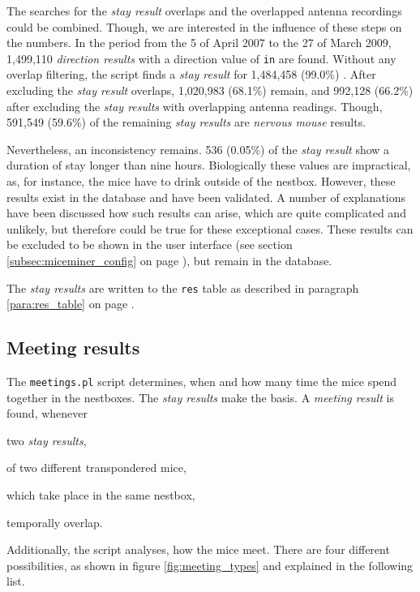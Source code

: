 The searches for the \textit{stay result} overlaps and the overlapped antenna recordings could be combined. Though, we are interested in the influence of these steps on the numbers. In the period from the 5 of April 2007 to the 27 of March 2009, 1,499,110 \textit{direction results} with a direction value of \lstinline|in| are found. Without any overlap filtering, the script finds a \textit{stay result} for 1,484,458 (99.0\%) . After excluding the \textit{stay result} overlaps, 1,020,983 (68.1\%) remain, and 992,128 (66.2\%) after excluding the \textit{stay results} with overlapping antenna readings. Though, 591,549 (59.6\%) of the remaining \textit{stay results} are \textit{nervous mouse} results.

Nevertheless, an inconsistency remains. 536 (0.05\%) of the \textit{stay result} show a duration of stay longer than nine hours. Biologically these values are impractical, as, for instance, the mice have to drink outside of the nestbox. However, these results exist in the database and have been validated. A number of explanations have been discussed how such results can arise, which are quite complicated and unlikely, but therefore could be true for these exceptional cases. These results can be excluded to be shown in the user interface (see section \ref{subsec:miceminer_config} on page \pageref{subsec:miceminer_config}), but remain in the database.     

The \textit{stay results} are written to the \lstinline|res| table as described in paragraph \ref{para:res_table} on page \pageref{para:res_table}.

\subsection{Meeting results}
\label{subsec:meetingres}

The \lstinline|meetings.pl| script determines, when and how many time the mice spend together in the nestboxes. The \textit{stay results} make the basis. A \textit{meeting result} is found, whenever

\begin{mylist}
\item two \textit{stay results},
\item of two different transpondered mice,
\item which take place in the same nestbox,
\item temporally overlap.
\end{mylist}

Additionally, the script analyses, how the mice meet. There are four different possibilities, as shown in figure \ref{fig:meeting_types} and explained in the following list.

